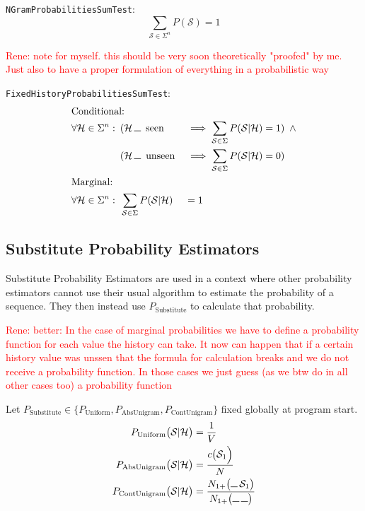 \documentclass[11pt,a4paper]{article}
\newcommand{\Seq}{\mathcal{S}}
\newcommand{\Hist}{\mathcal{H}}
\newcommand{\Skp}{\rule{7pt}{.5pt}}
\newcommand{\rp}[1]{\textcolor{red}{Rene: #1}}
\begin{document}
  \texttt{NGramProbabilitiesSumTest}:
  \begin{equation}
    \sum_{\Seq \in \Sigma^n} P(\Seq) = 1
  \end{equation}

  \rp{note for myself. this should be very soon theoretically "proofed" by me.
  Just also to have a proper formulation of everything in a probabilistic way}

  \texttt{FixedHistoryProbabilitiesSumTest}:
  \begin{alignat}{2}
    \intertext{Conditional:}
    \forall \Hist \in \Sigma^n:
    \enspace&(\Hist \, \Skp \enspace \mathrm{seen} &&\implies \sum_{\Seq \in \Sigma} P(\Seq | \Hist) = 1) \enspace \land \\
    \enspace&(\Hist \, \Skp \enspace \mathrm{unseen} &&\implies \sum_{\Seq \in \Sigma} P(\Seq | \Hist) = 0) \notag \\
    \intertext{Marginal:}
    \forall \Hist \in \Sigma^n:
    \enspace&\sum_{\Seq \in \Sigma} P(\Seq | \Hist) &&= 1
  \end{alignat}

  \subsection{Substitute Probability Estimators}

  Substitute Probability Estimators are used in a context where other
  probability estimators cannot use their usual algorithm to estimate the
  probability of a sequence. They then instead use $P_\mathrm{Substitute}$ to
  calculate that probability.

  \rp{better: In the case of marginal probabilities we have to define a
  probability function for each value the history can take. It now can happen
  that if a certain history value was unssen that the formula for calculation
  breaks and we do not receive a probability function. In those cases we just
  guess (as we btw do in all other cases too) a probability function}

  Let $P_\mathrm{Substitute} \in \big\{ P_\mathrm{Uniform} , P_\mathrm{AbsUnigram} , P_\mathrm{ContUnigram}\big\}$
  fixed globally at program start.
  \begin{align}
    P_\mathrm{Uniform}\big(\Seq | \Hist\big) &= \frac{1}{V} \\
    P_\mathrm{AbsUnigram}\big(\Seq | \Hist\big) &= \frac{c\big(\Seq_1\Big)}{N} \\
    P_\mathrm{ContUnigram}\big(\Seq | \Hist\big) &= \frac{N_{1+}\big(\Skp \, \Seq_1\big)}{N_{1+}\big(\Skp \, \Skp\big)}
  \end{align}
\end{document}
